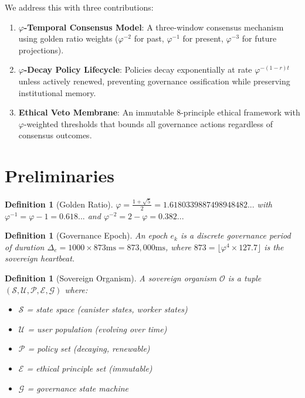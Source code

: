 \documentclass[11pt,twocolumn]{article}
\newtheorem{definition}[theorem]{Definition}
\begin{document}
We address this with three contributions:

\begin{enumerate}
\item \textbf{$\varphi$-Temporal Consensus Model}: A three-window consensus
  mechanism using golden ratio weights ($\varphi^{-2}$ for past, $\varphi^{-1}$
  for present, $\varphi^{-3}$ for future projections).
\item \textbf{$\varphi$-Decay Policy Lifecycle}: Policies decay exponentially
  at rate $\varphi^{-(1-r)t}$ unless actively renewed, preventing
  governance ossification while preserving institutional memory.
\item \textbf{Ethical Veto Membrane}: An immutable 8-principle ethical
  framework with $\varphi$-weighted thresholds that bounds all governance
  actions regardless of consensus outcomes.
\end{enumerate}

\section{Preliminaries}

\begin{definition}[Golden Ratio]
$\varphi = \frac{1 + \sqrt{5}}{2} = 1.6180339887498948482...$
with $\varphi^{-1} = \varphi - 1 = 0.618...$ and $\varphi^{-2} = 2 - \varphi = 0.382...$
\end{definition}

\begin{definition}[Governance Epoch]
An epoch $e_k$ is a discrete governance period of duration $\Delta_e = 1000 \times 873\text{ms} = 873{,}000\text{ms}$, where $873 = \lfloor\varphi^4 \times 127.7\rfloor$ is the sovereign heartbeat.
\end{definition}

\begin{definition}[Sovereign Organism]
A sovereign organism $\mathcal{O}$ is a tuple $(\mathcal{S}, \mathcal{U}, \mathcal{P}, \mathcal{E}, \mathcal{G})$ where:
\begin{itemize}
\item $\mathcal{S}$ = state space (canister states, worker states)
\item $\mathcal{U}$ = user population (evolving over time)
\item $\mathcal{P}$ = policy set (decaying, renewable)
\item $\mathcal{E}$ = ethical principle set (immutable)
\item $\mathcal{G}$ = governance state machine
\end{itemize}
\end{definition}
\end{document}
